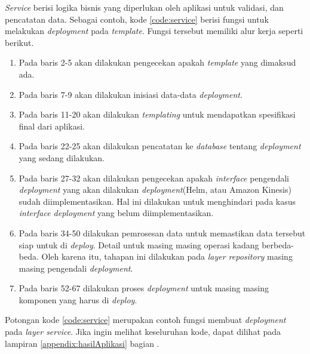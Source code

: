 \textit{Service} berisi logika bisnis yang diperlukan oleh aplikasi untuk validasi, dan pencatatan data. Sebagai contoh, kode \ref{code:service} berisi fungsi untuk melakukan \textit{deployment} pada \textit{template}. Fungsi tersebut memiliki alur kerja seperti berikut.
\begin{enumerate}
    \item Pada baris 2-5 akan dilakukan pengecekan apakah \textit{template} yang dimaksud ada.
    \item Pada baris 7-9 akan dilakukan inisiasi data-data \textit{deployment}.
    \item Pada baris 11-20 akan dilakukan \textit{templating} untuk mendapatkan spesifikasi final dari aplikasi.
    \item Pada baris 22-25 akan dilakukan pencatatan ke \textit{database} tentang \textit{deployment} yang sedang dilakukan.
    \item Pada baris 27-32 akan dilakukan pengecekan apakah \textit{interface} pengendali \textit{deployment} yang akan dilakukan \textit{deployment}(Helm, atau Amazon Kinesis) sudah diimplementasikan. Hal ini dilakukan untuk menghindari  pada kasus \textit{interface deployment} yang belum diimplementasikan.
    \item Pada baris 34-50 dilakukan pemrosesan data untuk memastikan data tersebut siap untuk di \textit{deploy}. Detail untuk masing masing operasi kadang berbeda-beda. Oleh karena itu, tahapan ini dilakukan pada \textit{layer repository} masing masing pengendali \textit{deployment}.
    \item Pada baris 52-67 dilakukan proses \textit{deployment} untuk masing masing komponen yang harus di \textit{deploy}.
\end{enumerate}
Potongan kode \ref{code:service}  merupakan contoh fungsi membuat \textit{deployment} pada \textit{layer service}. Jika ingin melihat keseluruhan kode, dapat dilihat pada lampiran \ref{appendix:hasilAplikasi} bagian .

